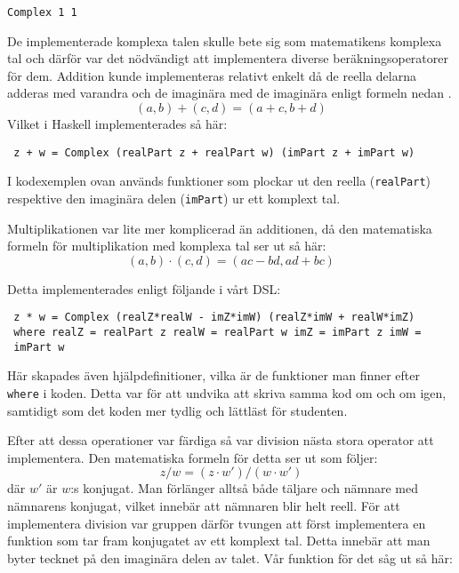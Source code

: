 \documentclass[]{article}
\begin{document}
\begin{verbatim}
Complex 1 1
\end{verbatim}

De implementerade komplexa talen skulle bete sig som matematikens
komplexa tal och därför var det nödvändigt att implementera diverse
beräkningsoperatorer för dem. Addition kunde implementeras relativt
enkelt då de reella delarna adderas med varandra och de imaginära med
de imaginära enligt formeln nedan \cite{conway1978functions}.
\[(a, b) + (c, d) = (a + c, b + d)\]
Vilket i Haskell implementerades så här:
\begin{verbatim}
 z + w = Complex (realPart z + realPart w) (imPart z + imPart w)
\end{verbatim}

I kodexemplen ovan används funktioner som plockar ut den reella
(\texttt{realPart}) respektive den imaginära delen
(\texttt{imPart}) ur ett komplext tal.

Multiplikationen var lite mer komplicerad än additionen, då den
matematiska formeln för multiplikation med komplexa tal ser ut så här:
 \[(a, b) \cdot (c, d) = (ac - bd, ad + bc) \] \cite{conway1978functions}

Detta implementerades enligt följande i vårt DSL:
\begin{verbatim}
 z * w = Complex (realZ*realW - imZ*imW) (realZ*imW + realW*imZ)
 where realZ = realPart z realW = realPart w imZ = imPart z imW =
 imPart w
\end{verbatim}

Här skapades även hjälpdefinitioner, vilka är de funktioner man finner
efter \texttt{where} i koden. Detta var för att undvika
att skriva samma kod om och om igen, samtidigt som det koden mer
tydlig och lättläst för studenten.

Efter att dessa operationer var färdiga så var division nästa stora
operator att implementera. Den matematiska formeln för detta ser ut
som följer:
\[ z / w = (z \cdot w') / (w \cdot w') \]
där $w'$ är $w$:s konjugat.
Man förlänger alltså både täljare och nämnare med nämnarens konjugat,
vilket innebär att nämnaren blir helt reell. För att implementera
division var gruppen därför tvungen att först implementera en funktion
som tar fram konjugatet av ett komplext tal. Detta innebär att man
byter tecknet på den imaginära delen av talet. Vår funktion för det
såg ut så här:
\end{document}
